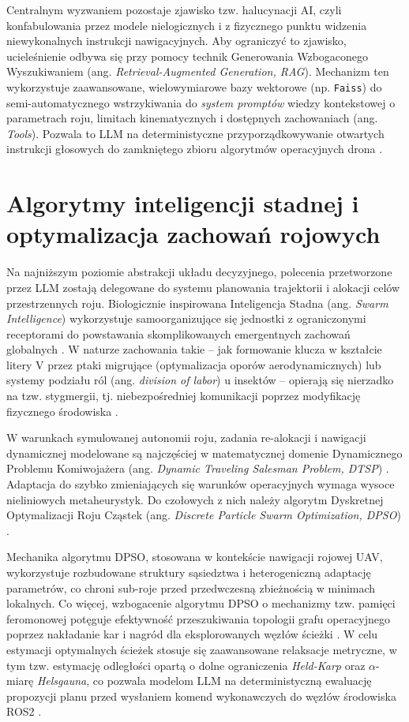 \documentclass[12pt,a4paper,twoside]{report}
\theoremstyle{definition} %
\begin{document}
Centralnym wyzwaniem pozostaje zjawisko tzw. halucynacji AI, czyli konfabulowania przez modele nielogicznych i z fizycznego punktu widzenia niewykonalnych instrukcji nawigacyjnych. Aby ograniczyć to zjawisko, ucieleśnienie odbywa się przy pomocy technik Generowania Wzbogaconego Wyszukiwaniem (ang. \textit{Retrieval-Augmented Generation, RAG}). Mechanizm ten wykorzystuje zaawansowane, wielowymiarowe bazy wektorowe (np. \texttt{Faiss}) do semi-automatycznego wstrzykiwania do \textit{system promptów} wiedzy kontekstowej o parametrach roju, limitach kinematycznych i dostępnych zachowaniach (ang. \textit{Tools}). Pozwala to LLM na deterministyczne przyporządkowywanie otwartych instrukcji głosowych do zamkniętego zbioru algorytmów operacyjnych drona \cite{rachwal2025}.

\section{Algorytmy inteligencji stadnej i optymalizacja zachowań rojowych}
Na najniższym poziomie abstrakcji układu decyzyjnego, polecenia przetworzone przez LLM zostają delegowane do systemu planowania trajektorii i alokacji celów przestrzennych roju. Biologicznie inspirowana Inteligencja Stadna (ang. \textit{Swarm Intelligence}) wykorzystuje samoorganizujące się jednostki z ograniczonymi receptorami do powstawania skomplikowanych emergentnych zachowań globalnych \cite{bonabeau1999, kennedy2001}. W naturze zachowania takie -- jak formowanie klucza w kształcie litery V przez ptaki migrujące (optymalizacja oporów aerodynamicznych) lub systemy podziału ról (ang. \textit{division of labor}) u insektów -- opierają się nierzadko na tzw. stygmergii, tj. niebezpośredniej komunikacji poprzez modyfikację fizycznego środowiska \cite{bonabeau1999, kennedy2001}.

W warunkach symulowanej autonomii roju, zadania re-alokacji i nawigacji dynamicznej modelowane są najczęściej w matematycznej domenie Dynamicznego Problemu Komiwojażera (ang. \textit{Dynamic Traveling Salesman Problem, DTSP}) \cite{strak2017}. Adaptacja do szybko zmieniających się warunków operacyjnych wymaga wysoce nieliniowych metaheurystyk. Do czołowych z nich należy algorytm Dyskretnej Optymalizacji Roju Cząstek (ang. \textit{Discrete Particle Swarm Optimization, DPSO}) \cite{strak2017}.

Mechanika algorytmu DPSO, stosowana w kontekście nawigacji rojowej UAV, wykorzystuje rozbudowane struktury sąsiedztwa i heterogeniczną adaptację parametrów, co chroni sub-roje przed przedwczesną zbieżnością w minimach lokalnych. Co więcej, wzbogacenie algorytmu DPSO o mechanizmy tzw. pamięci feromonowej potęguje efektywność przeszukiwania topologii grafu operacyjnego poprzez nakładanie kar i nagród dla eksplorowanych węzłów ścieżki \cite{strak2017}. W celu estymacji optymalnych ścieżek stosuje się zaawansowane relaksacje metryczne, w tym tzw. estymację odległości opartą o dolne ograniczenia \textit{Held-Karp} oraz $\alpha$-miarę \textit{Helsgauna}, co pozwala modelom LLM na deterministyczną ewaluację propozycji planu przed wysłaniem komend wykonawczych do węzłów środowiska ROS2 \cite{strak2017}.
\end{document}
